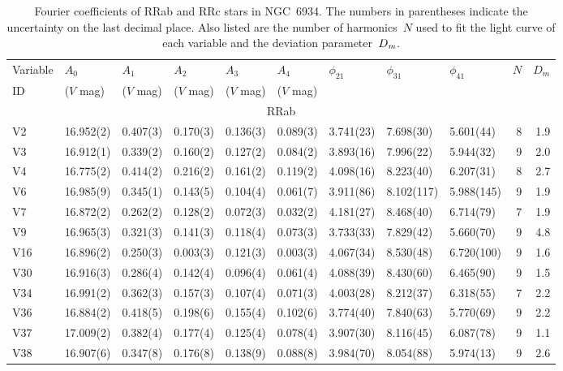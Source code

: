 \documentclass[journal]{rmaa}
\newcommand{\1}{\'{\i}}
\def\RRab{RRab }
\def\RRc{RRc }
\begin{document}
\begin{table*}
\scriptsize
\begin{center}
\caption[] {Fourier coefficients of  \RRab and \RRc stars in NGC~6934.
The numbers in parentheses indicate
the uncertainty on the last decimal place. Also listed are the number of
harmonics~$N$ used to fit the light curve of each variable and the
deviation
parameter~$D_{\textit{\lowercase{m}}}$.}
\label{tab:fourier_coeffs}
\begin{tabular}{lllllllllrr}
\hline
Variable     & $A_{0}$    & $A_{1}$   & $A_{2}$   & $A_{3}$   & $A_{4}$   &$\phi_{21}$ & $\phi_{31}$ & $\phi_{41}$
& $N$   &$D_m$ \\
  ID     & ($V$ mag)  & ($V$ mag)  &  ($V$ mag) & ($V$ mag)& ($V$ mag) & &  & & & \\
\hline
\multicolumn{11}{c}{RRab} \\
\hline
V2 &16.952(2)& 0.407(3)& 0.170(3)& 0.136(3)& 0.089(3)& 3.741(23)& 7.698(30)&5.601(44)& 8&1.9\\
V3 &16.912(1)& 0.339(2)& 0.160(2)& 0.127(2)& 0.084(2)& 3.893(16)& 7.996(22)& 5.944(32)& 9&2.0\\
V4 &16.775(2)& 0.414(2)& 0.216(2)& 0.161(2)& 0.119(2)& 4.098(16)& 8.223(40)& 6.207(31)& 8&2.7\\
V6 &16.985(9)& 0.345(1)& 0.143(5)& 0.104(4)& 0.061(7)& 3.911(86)& 8.102(117)& 5.988(145)&9&1.9\\
V7 &16.872(2)& 0.262(2)& 0.128(2)& 0.072(3)& 0.032(2)& 4.181(27)& 8.468(40)& 6.714(79)& 7&1.9\\
V9  &16.965(3)& 0.321(3)& 0.141(3)& 0.118(4)& 0.073(3)& 3.733(33)& 7.829(42)& 5.660(70)& 9&4.8\\
V16 &16.896(2)& 0.250(3)& 0.003(3)& 0.121(3)& 0.003(3)& 4.067(34)& 8.530(48)& 6.720(100)& 9&1.6\\
V30 &16.916(3)& 0.286(4)& 0.142(4)& 0.096(4)& 0.061(4)& 4.088(39)& 8.430(60)& 6.465(90)& 9&1.5\\
V34 &16.991(2)& 0.362(3)& 0.157(3)& 0.107(4)& 0.071(3)& 4.003(28)& 8.212(37)& 6.318(55)& 7&2.2\\
V36 &16.884(2)& 0.418(5)& 0.198(6)& 0.155(4)& 0.102(6)& 3.774(40)& 7.840(63)& 5.770(69)& 9&2.2\\
V37 &17.009(2)& 0.382(4)& 0.177(4)& 0.125(4)& 0.078(4)& 3.907(30)& 8.116(45)& 6.087(78)& 9&1.1\\
V38 &16.907(6)& 0.347(8)& 0.176(8)& 0.138(9)& 0.088(8)& 3.984(70)& 8.054(88)& 5.974(13)& 9&2.6\\

\end{tabular}
\end{center}
\end{table*}
\end{document}
